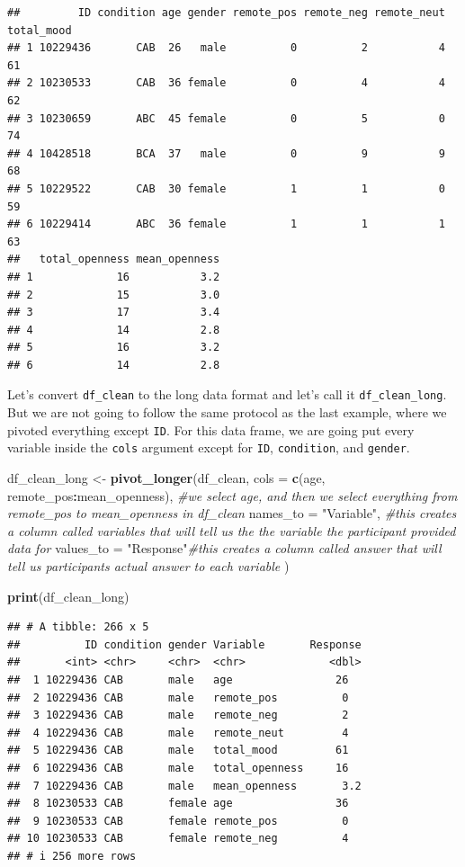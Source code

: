 \documentclass[
]{book}
\newenvironment{Shaded}{\begin{snugshade}}{\end{snugshade}}
\newcommand{\AttributeTok}[1]{\textcolor[rgb]{0.13,0.29,0.53}{#1}}
\newcommand{\CommentTok}[1]{\textcolor[rgb]{0.56,0.35,0.01}{\textit{#1}}}
\newcommand{\FunctionTok}[1]{\textcolor[rgb]{0.13,0.29,0.53}{\textbf{#1}}}
\newcommand{\NormalTok}[1]{#1}
\newcommand{\OtherTok}[1]{\textcolor[rgb]{0.56,0.35,0.01}{#1}}
\newcommand{\SpecialCharTok}[1]{\textcolor[rgb]{0.81,0.36,0.00}{\textbf{#1}}}
\newcommand{\StringTok}[1]{\textcolor[rgb]{0.31,0.60,0.02}{#1}}
\begin{document}
\begin{verbatim}
##         ID condition age gender remote_pos remote_neg remote_neut total_mood
## 1 10229436       CAB  26   male          0          2           4         61
## 2 10230533       CAB  36 female          0          4           4         62
## 3 10230659       ABC  45 female          0          5           0         74
## 4 10428518       BCA  37   male          0          9           9         68
## 5 10229522       CAB  30 female          1          1           0         59
## 6 10229414       ABC  36 female          1          1           1         63
##   total_openness mean_openness
## 1             16           3.2
## 2             15           3.0
## 3             17           3.4
## 4             14           2.8
## 5             16           3.2
## 6             14           2.8
\end{verbatim}

Let's convert \texttt{df\_clean} to the long data format and let's call it \texttt{df\_clean\_long}. But we are not going to follow the same protocol as the last example, where we pivoted everything except \texttt{ID}. For this data frame, we are going put every variable inside the \texttt{cols} argument except for \texttt{ID}, \texttt{condition}, and \texttt{gender}.

\begin{Shaded}
\begin{Highlighting}[]
\NormalTok{df\_clean\_long }\OtherTok{\textless{}{-}} \FunctionTok{pivot\_longer}\NormalTok{(df\_clean,}
  \AttributeTok{cols =} \FunctionTok{c}\NormalTok{(age, remote\_pos}\SpecialCharTok{:}\NormalTok{mean\_openness), }\CommentTok{\#we select age, and then we select everything from remote\_pos to mean\_openness in df\_clean}
  \AttributeTok{names\_to =} \StringTok{"Variable"}\NormalTok{, }\CommentTok{\#this creates a column called \textasciigrave{}variables\textasciigrave{} that will tell us the the variable the participant provided data for}
  \AttributeTok{values\_to =} \StringTok{"Response"}\CommentTok{\#this creates a column called \textasciigrave{}answer\textasciigrave{} that will tell us participants actual answer to each variable}
\NormalTok{)}


\FunctionTok{print}\NormalTok{(df\_clean\_long)}
\end{Highlighting}
\end{Shaded}

\begin{verbatim}
## # A tibble: 266 x 5
##          ID condition gender Variable       Response
##       <int> <chr>     <chr>  <chr>             <dbl>
##  1 10229436 CAB       male   age                26  
##  2 10229436 CAB       male   remote_pos          0  
##  3 10229436 CAB       male   remote_neg          2  
##  4 10229436 CAB       male   remote_neut         4  
##  5 10229436 CAB       male   total_mood         61  
##  6 10229436 CAB       male   total_openness     16  
##  7 10229436 CAB       male   mean_openness       3.2
##  8 10230533 CAB       female age                36  
##  9 10230533 CAB       female remote_pos          0  
## 10 10230533 CAB       female remote_neg          4  
## # i 256 more rows
\end{verbatim}
\end{document}
